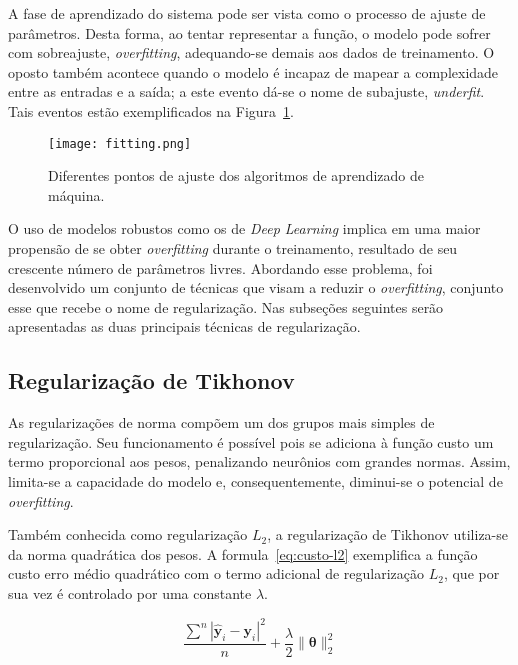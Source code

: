 A fase de aprendizado do sistema pode ser vista como o processo de ajuste de parâmetros. Desta forma, ao tentar representar a função, o modelo pode sofrer com sobreajuste, \textit{overfitting}, adequando-se demais aos dados de treinamento. O oposto também acontece quando o modelo é incapaz de mapear a complexidade entre as entradas e a saída; a este evento dá-se o nome de subajuste, \textit{underfit}. Tais eventos estão exemplificados na Figura~\ref{fig:fitting}.


\begin{figure}
\begin{center} {
    \begin{center}
    \texttt{[image: fitting.png]}
    \caption{Diferentes pontos de ajuste dos algoritmos de aprendizado de máquina.}
    \label{fig:fitting}
    \end{center}
}
\end{center}
\end{figure}

O uso de modelos robustos como os de \textit{Deep Learning} implica em uma maior propensão de se obter \textit{overfitting} durante o treinamento, resultado de seu crescente número de parâmetros livres. Abordando esse problema, foi desenvolvido um conjunto de técnicas que visam a reduzir o \textit{overfitting}, conjunto esse que recebe o nome de regularização. Nas subseções seguintes serão apresentadas as duas principais técnicas de regularização.

\subsection{Regularização de Tikhonov}

As regularizações de norma compõem um dos grupos mais simples de regularização. Seu funcionamento é possível pois se adiciona à função custo um termo proporcional aos pesos, penalizando neurônios com grandes normas. Assim, limita-se a capacidade do modelo e, consequentemente, diminui-se o potencial de \textit{overfitting}.

Também conhecida como regularização $L_{2}$, a regularização de Tikhonov utiliza-se da norma quadrática dos pesos. A formula~\ref{eq:custo-l2} exemplifica a função custo erro médio quadrático com o termo adicional de regularização $L_{2}$, que por sua vez é controlado por uma constante $\lambda$.

\begin{equation} \label{eq:custo-l2}
    \frac{\displaystyle\sum^n |\hat{\mathbf{y}}_i - \mathbf{y}_i|^2}{n} + \frac{\lambda}{2} \lVert \boldsymbol{\theta} \rVert_{2}^{2}
\end{equation}

